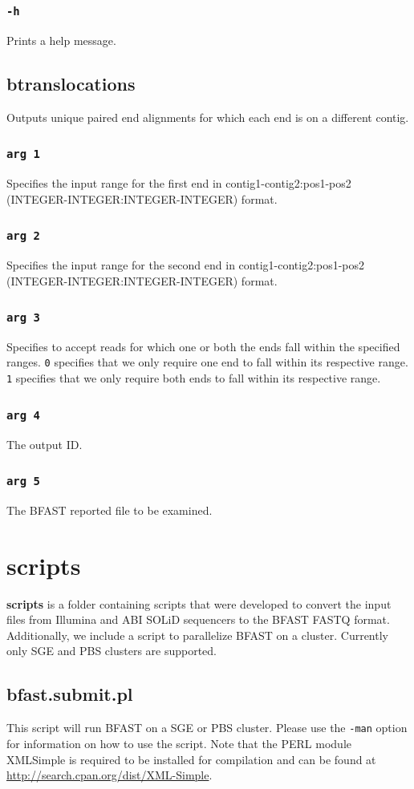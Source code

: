 \documentclass[a4paper,12pt]{book}
\newcommand{\TT}[1]{{\tt #1}} %
\newcommand{\BF}[1]{{\bf #1}} %
\newcommand{\BRF}{BFAST reported file} %
\begin{document}
\subsubsection{\TT{-h}}
Prints a help message.
\subsection{btranslocations}
\label{sec:btranslocations}
Outputs unique paired end alignments for which each end is on a different contig.
\subsubsection{\TT{arg 1}}
Specifies the input range for the first end in contig1-contig2:pos1-pos2 (INTEGER-INTEGER:INTEGER-INTEGER) format.
\subsubsection{\TT{arg 2}}
Specifies the input range for the second end in contig1-contig2:pos1-pos2 (INTEGER-INTEGER:INTEGER-INTEGER) format.
\subsubsection{\TT{arg 3}}
Specifies to accept reads for which one or both the ends fall within the specified ranges.
\TT{0} specifies that we only require one end to fall within its respective range.
\TT{1} specifies that we only require both ends to fall within its respective range.
\subsubsection{\TT{arg 4}}
The output ID.
\subsubsection{\TT{arg 5}}
The \BRF{} to be examined.
\section{scripts}
\label{sec:scripts}
\BF{scripts} is a folder containing scripts that were developed to convert the input files from Illumina and ABI SOLiD sequencers to the BFAST FASTQ format.
Additionally, we include a script to parallelize BFAST on a cluster.
Currently only SGE and PBS clusters are supported.

\subsection{bfast.submit.pl}
This script will run BFAST on a SGE or PBS cluster.
Please use the \TT{-man} option for information on how to use the script.
Note that the PERL module XML\:\:Simple is required to be installed for compilation and can be found at \url{http://search.cpan.org/dist/XML-Simple}.
\end{document}
